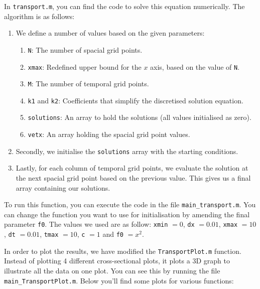 \documentclass[]{article}
\def\incode#1{\texttt{#1}}
\begin{document}
	\noindent In \incode{transport.m}, you can find the code to solve this equation numerically. The algorithm is as follows:
	\begin{enumerate}
		\item We define a number of values based on the given parameters:
		\begin{enumerate}
			\item \incode{N}: The number of spacial grid points.
			\item \incode{xmax}: Redefined upper bound for the $x$ axis, based on the value of \incode{N}.
			\item \incode{M}: The number of temporal grid points. 
			\item \incode{k1} and \incode{k2}: Coefficients that simplify the discretised solution equation.
			\item \incode{solutions}: An array to hold the solutions (all values initialised as zero). 
			\item \incode{vetx}: An array holding the spacial grid point values.
		\end{enumerate}
		\item Secondly, we initialise the \incode{solutions} array with the starting conditions.
		\item Lastly, for each column of temporal grid points, we evaluate the solution at the next spacial grid point based on the previous value. This gives us a final array containing our solutions.
	\end{enumerate}
	To run this function, you can execute the code in the file \incode{main\_transport.m}. You can change the function you want to use for initialisation by amending the final parameter \incode{f0}. The values we used are as follow: \incode{xmin} $= 0$, \incode{dx} $= 0.01$, \incode{xmax} $= 10$, \incode{dt} $= 0.01$, \incode{tmax} $= 10$, \incode{c} $= 1$ and \incode{f0} $= x^2$. 
	
	In order to plot the results, we have modified the \incode{TransportPlot.m} function. Instead of plotting 4 different cross-sectional plots, it plots a 3D graph to illustrate all the data on one plot. You can see this by running the file \incode{main\_TransportPlot.m}. Below you'll find some plots for various functions:
	
\end{document}
